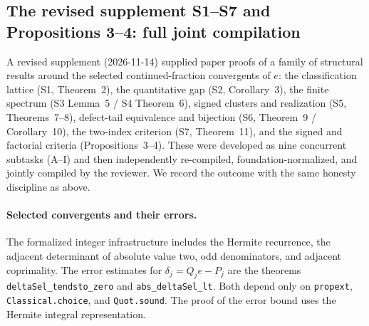 \documentclass[11pt]{amsart}
\theoremstyle{definition}
\theoremstyle{remark}
\numberwithin{equation}{section}
\newcommand{\ee}{e}
\begin{document}
\subsection{The revised supplement S1--S7 and Propositions 3--4: full joint compilation}\label{sec:lean-m6}

A revised supplement (2026-11-14) supplied paper proofs of a family of structural results around the selected continued-fraction convergents of $\ee$: the classification lattice (S1, Theorem~2), the quantitative gap (S2, Corollary~3), the finite spectrum (S3 Lemma~5 / S4 Theorem~6), signed clusters and realization (S5, Theorems~7--8), defect-tail equivalence and bijection (S6, Theorem~9 / Corollary~10), the two-index criterion (S7, Theorem~11), and the signed and factorial criteria (Propositions~3--4). These were developed as nine concurrent subtasks (A--I) and then independently re-compiled, foundation-normalized, and jointly compiled by the reviewer. We record the outcome with the same honesty discipline as above.

\paragraph{Selected convergents and their errors.}
The formalized integer infrastructure includes the Hermite recurrence,
the adjacent determinant of absolute value two, odd denominators, and
adjacent coprimality. The error estimates for
$\delta_j=Q_j e-P_j$ are the theorems \texttt{deltaSel\_tendsto\_zero}
and \texttt{abs\_deltaSel\_lt}. Both depend only on
\texttt{propext}, \texttt{Classical.choice}, and \texttt{Quot.sound}.
The proof of the error bound uses the Hermite integral representation.
\end{document}
